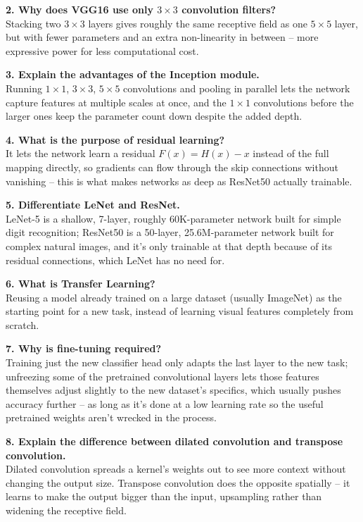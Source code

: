 \documentclass[11pt]{article}
\begin{document}
\textbf{2. Why does VGG16 use only $3\times3$ convolution filters?}\\
Stacking two $3\times3$ layers gives roughly the same receptive field as one $5\times5$ layer, but with fewer parameters and an extra non-linearity in between -- more expressive power for less computational cost.

\textbf{3. Explain the advantages of the Inception module.}\\
Running $1\times1$, $3\times3$, $5\times5$ convolutions and pooling in parallel lets the network capture features at multiple scales at once, and the $1\times1$ convolutions before the larger ones keep the parameter count down despite the added depth.

\textbf{4. What is the purpose of residual learning?}\\
It lets the network learn a residual $F(x) = H(x) - x$ instead of the full mapping directly, so gradients can flow through the skip connections without vanishing -- this is what makes networks as deep as ResNet50 actually trainable.

\textbf{5. Differentiate LeNet and ResNet.}\\
LeNet-5 is a shallow, 7-layer, roughly 60K-parameter network built for simple digit recognition; ResNet50 is a 50-layer, 25.6M-parameter network built for complex natural images, and it's only trainable at that depth because of its residual connections, which LeNet has no need for.

\textbf{6. What is Transfer Learning?}\\
Reusing a model already trained on a large dataset (usually ImageNet) as the starting point for a new task, instead of learning visual features completely from scratch.

\textbf{7. Why is fine-tuning required?}\\
Training just the new classifier head only adapts the last layer to the new task; unfreezing some of the pretrained convolutional layers lets those features themselves adjust slightly to the new dataset's specifics, which usually pushes accuracy further -- as long as it's done at a low learning rate so the useful pretrained weights aren't wrecked in the process.

\textbf{8. Explain the difference between dilated convolution and transpose convolution.}\\
Dilated convolution spreads a kernel's weights out to see more context without changing the output size. Transpose convolution does the opposite spatially -- it learns to make the output bigger than the input, upsampling rather than widening the receptive field.
\end{document}
